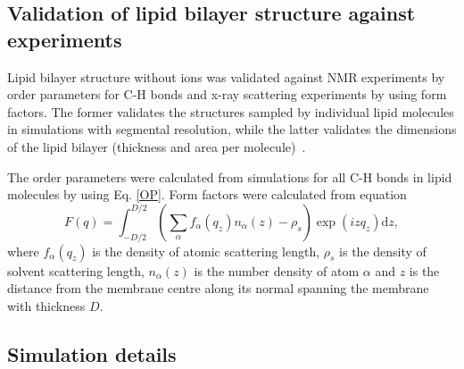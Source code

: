\documentclass[aip,jcp,twocolumn]{revtex4}
\begin{document}
\subsection{Validation of lipid bilayer structure against experiments}

Lipid bilayer structure without ions was validated against NMR experiments
by order parameters for C-H bonds and \mbox{x-ray} scattering experiments by using
form factors. The former validates the structures sampled by individual
lipid molecules in simulations with segmental resolution, while the latter
validates the dimensions of the lipid bilayer (thickness and area per
molecule)~\cite{ollila16}.

The order parameters were calculated from simulations for all C-H bonds
in lipid molecules by using Eq. \ref{OP}. Form factors were calculated 
from equation
\begin{equation}
  F(q) = \int _{-D/2} ^{D/2} \left ( \sum _\alpha f_\alpha (q_z) n_\alpha (z) - \rho _s \right ) \exp (izq_z) \mathrm{d}z,
\end{equation}
where $f_\alpha(q_z)$ is the density of atomic scattering length, 
$\rho_s$ is the density of solvent scattering length,
$n_\alpha (z)$ is the number density of atom $\alpha$ and
$z$ is the distance from the membrane centre along its normal 
spanning the membrane with thickness $D$. 




\subsection{Simulation details}
\end{document}
